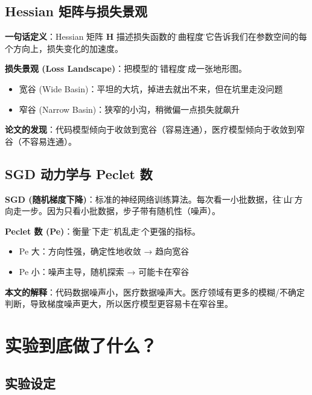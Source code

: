 \documentclass[12pt,a4paper]{article}
\begin{document}
\subsection{Hessian 矩阵与损失景观}

\begin{conceptbox}
\textbf{一句话定义}：Hessian 矩阵 $\mathbf{H}$ 描述损失函数的\"弯曲程度\"。它告诉我们在参数空间的每个方向上，损失变化的加速度。

\textbf{损失景观 (Loss Landscape)}：把模型的\"犯错程度\"画成一张地形图。
\begin{itemize}
    \item 宽谷 (Wide Basin)：平坦的大坑，掉进去就出不来，但在坑里走没问题
    \item 窄谷 (Narrow Basin)：狭窄的小沟，稍微偏一点损失就飙升
\end{itemize}

\textbf{论文的发现}：代码模型倾向于收敛到宽谷（容易连通），医疗模型倾向于收敛到窄谷（不容易连通）。
\end{conceptbox}

\subsection{SGD 动力学与 Peclet 数}

\begin{conceptbox}
\textbf{SGD (随机梯度下降)}：标准的神经网络训练算法。每次看一小批数据，往\"下山\"的方向走一步。因为只看小批数据，步子带有随机性（噪声）。

\textbf{Peclet 数 (Pe)}：衡量\"往下走\"和\"随机乱走\"哪个更强的指标。
\begin{itemize}
    \item Pe 大：方向性强，确定性地收敛 → 趋向宽谷
    \item Pe 小：噪声主导，随机探索 → 可能卡在窄谷
\end{itemize}

\textbf{本文的解释}：代码数据噪声小，医疗数据噪声大。医疗领域有更多的模糊/不确定判断，导致梯度噪声更大，所以医疗模型更容易卡在窄谷里。
\end{conceptbox}

\section{实验到底做了什么？}

\subsection{实验设定}
\end{document}
